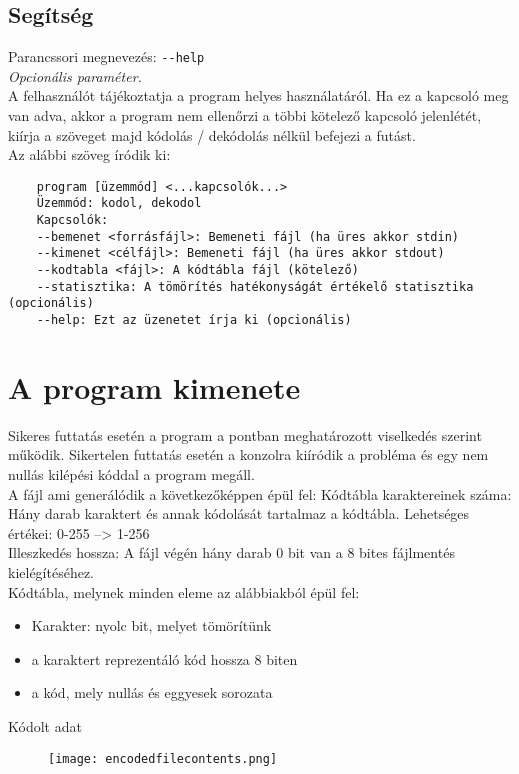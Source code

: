 \subsection{Segítség}
Parancssori megnevezés: \texttt{-{}-help} \\
{\it Opcionális paraméter.}\\
A felhasználót tájékoztatja a program helyes használatáról. Ha ez a kapcsoló meg van adva, akkor a program nem ellenőrzi
a többi kötelező kapcsoló jelenlétét, kiírja a szöveget majd kódolás / dekódolás nélkül befejezi a futást.\\
Az alábbi szöveg íródik ki: \\
\begin{verbatim}    
    program [üzemmód] <...kapcsolók...>
    Üzemmód: kodol, dekodol
    Kapcsolók:
    --bemenet <forrásfájl>: Bemeneti fájl (ha üres akkor stdin)
    --kimenet <célfájl>: Bemeneti fájl (ha üres akkor stdout)
    --kodtabla <fájl>: A kódtábla fájl (kötelező)
    --statisztika: A tömörítés hatékonyságát értékelő statisztika (opcionális)
    --help: Ezt az üzenetet írja ki (opcionális)
\end{verbatim}


\section{A program kimenete}
Sikeres futtatás esetén a program a  pontban meghatározott viselkedés szerint működik.
Sikertelen futtatás esetén a konzolra kiíródik a probléma és egy nem nullás kilépési kóddal a program megáll. \\
A fájl ami generálódik a következőképpen épül fel:
Kódtábla karaktereinek száma: Hány darab karaktert és annak kódolását tartalmaz a kódtábla. Lehetséges értékei: 0-255 --> 1-256 \\
Illeszkedés hossza: A fájl végén hány darab 0 bit van a 8 bites fájlmentés kielégítéséhez. \\
Kódtábla, melynek minden eleme az alábbiakból épül fel:\\
\begin{itemize}
    \item Karakter: nyolc bit, melyet tömörítünk
    \item a karaktert reprezentáló kód hossza 8 biten
    \item a kód, mely nullás és eggyesek sorozata
\end{itemize}
Kódolt adat

\begin{figure}[H]
    \centerline{\texttt{[image: encodedfilecontents.png]}}
\end{figure}